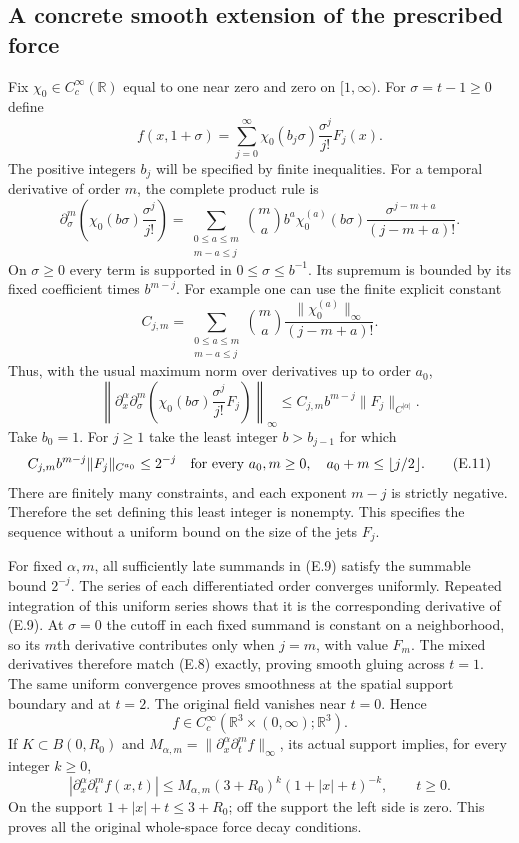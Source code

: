 \documentclass[10pt,a4paper]{article}
\begin{document}
\subsection{A concrete smooth extension of the prescribed force}

Fix $\chi_0\in C_c^\infty(\mathbb R)$ equal to one near zero and
zero on $[1,\infty)$. For $\sigma=t-1\ge0$ define
\[
 f(x,1+\sigma)=
 \sum_{j=0}^\infty \chi_0(b_j\sigma)\frac{\sigma^j}{j!}F_j(x).
 \tag{E.9}
\]
The positive integers $b_j$ will be specified by finite inequalities.
For a temporal derivative of order $m$, the complete product rule is
\[
 \partial_\sigma^m\left(\chi_0(b\sigma)\frac{\sigma^j}{j!}\right)
 =\sum_{\substack{0\le a\le m\\m-a\le j}}
   \binom ma b^a\chi_0^{(a)}(b\sigma)
                    \frac{\sigma^{j-m+a}}{(j-m+a)!}.
\]
On $\sigma\ge0$ every term is supported in $0\le\sigma\le b^{-1}$.
Its supremum is bounded by its fixed coefficient times $b^{m-j}$.
For example one can use the finite explicit constant
\[
 C_{j,m}=\sum_{\substack{0\le a\le m\\m-a\le j}}
        \binom ma\frac{\|\chi_0^{(a)}\|_\infty}{(j-m+a)!}.
\]
Thus, with the usual maximum norm over derivatives up to order $a_0$,
\[
 \left\|\partial_x^\alpha\partial_\sigma^m
       \left(\chi_0(b\sigma)\frac{\sigma^j}{j!}F_j\right)\right\|_\infty
 \le C_{j,m}b^{m-j}\|F_j\|_{C^{|\alpha|}}.
 \tag{E.10}
\]
Take $b_0=1$. For $j\ge1$ take the least integer $b>b_{j-1}$
for which
\[
 C_{j,m}b^{m-j}\|F_j\|_{C^{a_0}}\le2^{-j}
 \quad\hbox{for every }a_0,m\ge0,\quad
                   a_0+m\le\lfloor j/2\rfloor.
 \tag{E.11}
\]
There are finitely many constraints, and each exponent $m-j$ is
strictly negative. Therefore the set defining this least integer is
nonempty. This specifies the sequence without a uniform bound on the
size of the jets $F_j$.

For fixed $\alpha,m$, all sufficiently late summands in (E.9) satisfy
the summable bound $2^{-j}$. The series of each differentiated order
converges uniformly. Repeated integration of this uniform series
shows that it is the corresponding derivative of (E.9). At $\sigma=0$
the cutoff in each fixed summand is constant on a neighborhood, so its
$m$th derivative contributes only when $j=m$, with value $F_m$.
The mixed derivatives therefore match (E.8) exactly, proving smooth
gluing across $t=1$. The same uniform convergence proves smoothness
at the spatial support boundary and at $t=2$. The original field
vanishes near $t=0$. Hence
\[
 f\in C_c^\infty(\mathbb R^3\times(0,\infty);\mathbb R^3).
 \tag{E.12}
\]
If $K\subset B(0,R_0)$ and
$M_{\alpha,m}=\|\partial_x^\alpha\partial_t^mf\|_\infty$, its
actual support implies, for every integer $k\ge0$,
\[
 |\partial_x^\alpha\partial_t^mf(x,t)|
 \le M_{\alpha,m}(3+R_0)^k(1+|x|+t)^{-k},\qquad t\ge0.
 \tag{E.13}
\]
On the support $1+|x|+t\le3+R_0$; off the support the left side is
zero. This proves all the original whole-space force decay conditions.
\end{document}
